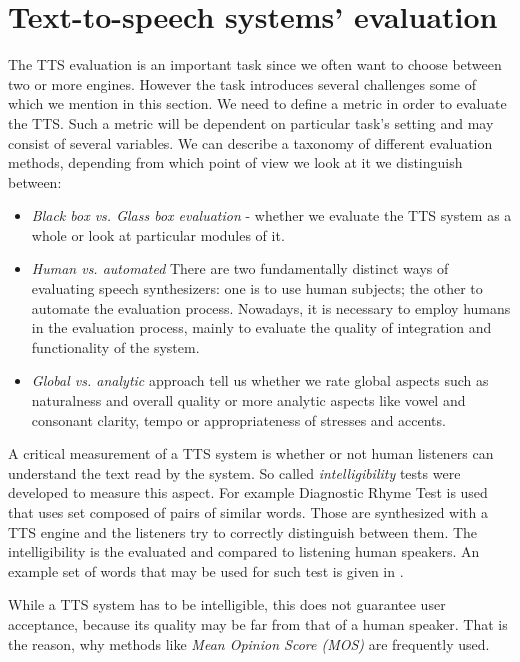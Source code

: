 \section{Text-to-speech systems' evaluation}
\label{tts-eval}
The TTS evaluation\cite{huang2001spoken} is an important task since we often want to choose between two or more engines.
However the task introduces several challenges some of which we mention in this section.
We need to define a metric in order to evaluate the TTS.
Such a metric will be dependent on particular task's setting and may consist of several variables.
We can describe a taxonomy of different evaluation methods, depending from which point of view we look at it we distinguish between:
\begin{itemize}
\item \textit{Black box vs. Glass box evaluation} - whether we evaluate the TTS system as a whole or look at particular modules of it.
\item \textit{Human vs. automated} There are two fundamentally distinct ways of evaluating
speech synthesizers: one is to use human subjects; the other to automate the evaluation process.
Nowadays, it is necessary to employ humans in the evaluation process, mainly to evaluate the quality of integration and functionality of the system.
\item \textit{Global vs. analytic} approach tell us whether we rate global aspects such as naturalness and overall quality or more analytic aspects like vowel and consonant clarity, tempo or appropriateness of stresses and accents.
\end{itemize}
\par
A critical measurement of a TTS system is whether or not human listeners can understand
the text read by the system. So called \textit{intelligibility} tests were developed to measure this aspect.
For example Diagnostic Rhyme Test is used that uses set composed of pairs of similar words.
Those are synthesized with a TTS engine and the listeners try to correctly distinguish between them.
The intelligibility is the evaluated and compared to listening human speakers.
An example set of words that may be used for such test is given in .
\par
While a TTS system has to be intelligible, this does not guarantee user acceptance, because
its quality may be far from that of a human speaker.
That is the reason, why methods like \textit{Mean Opinion Score (MOS)} are frequently used.
